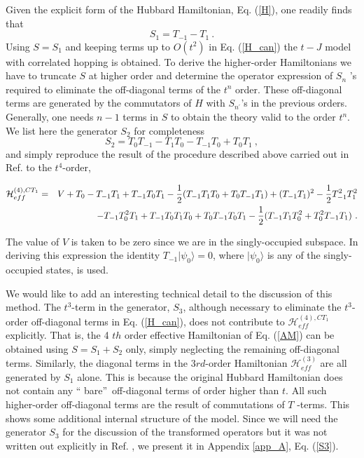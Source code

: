 \documentclass[floatfix,twocolumn,aps,prb,showpacs,superscriptaddress]{revtex4}
\def\tone{T_1}
\def\tzero{T_0}
\begin{document}
Given the explicit form of the Hubbard Hamiltonian, Eq. (\ref{H}), one
readily finds that
\begin{equation}
S_{1}=T_{-1}-T_{1}\ .  \label{S1}
\end{equation}%
Using $S=S_{1}$ and keeping terms up to $O(t^{2})$ in Eq. (\ref{H_can}) the $%
t-J$ model with correlated hopping 
is obtained. To derive the higher-order Hamiltonians we have to
truncate $S$ at higher order and determine the operator expression of $S_{n}$%
's required to eliminate the off-diagonal terms of the $t^{n}$ order. These
off-diagonal terms are generated by the commutators of $H$ with $%
S_{n^{\prime }}$'s in the previous orders. Generally, one needs $n-1$ terms
in $S$ to obtain the theory valid to the order $t^{n}$. We list here the
generator $S_{2}$ for completeness
\begin{equation}
S_{2}=T_{0}T_{-1}-T_{1}T_{0}-T_{-1}T_{0}+T_{0}T_{1}\ ,  \label{S2}
\end{equation}%
and simply reproduce the result of the procedure described above carried out
in Ref.  to the $t^{4}$-order,
\begin{widetext}
\begin{eqnarray}
\mathcal{H}^{(4),CT_1}_{eff}&=&V+T_0-T_{-1}T_1
+T_{-1}T_0T_1-\frac12(T_{-1}T_1T_0+T_0T_{-1}T_1)+
(\tm\tone)^2-\frac12\tm^2\tone^2  \nonumber \\
&&-T_{-1}\tzero^2T_1+T_{-1}T_0T_1T_0+T_0T_{-1}T_0T_1
-\frac12(T_{-1}T_1\tzero^2+\tzero^2T_{-1}T_1) \ .  \label{AM}
\end{eqnarray}
\end{widetext}
The value of $V$ is taken to be zero since we are in the singly-occupied
subspace. In deriving this expression the identity $T_{-1}|\psi _{0}\rangle
=0$, where $|\psi _{0}\rangle $ is any of the singly-occupied states, is used.


We would like to add an interesting technical detail to the discussion of
this method. The $t^{3}$-term in the generator, $S_{3}$, although necessary
to eliminate the $t^{3}$-order off-diagonal terms in Eq. (\ref{H_can}), does
not contribute to $\mathcal{H}_{eff}^{(4),CT_{1}}$ explicitly. That is, the 4%
$th$ order effective Hamiltonian of Eq. (\ref{AM}) can be obtained using $%
S=S_{1}+S_{2}$ only, simply neglecting the remaining off-diagonal terms.
Similarly, the diagonal terms in the 3$rd$-order Hamiltonian $\mathcal{H}%
_{eff}^{(3)}$ are all generated by $S_{1}$ alone. This is because the
original Hubbard Hamiltonian does not contain any \textquotedblleft
bare\textquotedblright\ off-diagonal terms of order higher than $t$. All
such higher-order off-diagonal terms are the result of commutations of $T$%
-terms. This shows some additional internal structure of the model. Since we
will need the generator $S_{3}$ for the discussion of the transformed operators
but it was not written out explicitly in Ref. , we
present it in Appendix \ref{app_A}, Eq. (\ref{S3}).
\end{document}

